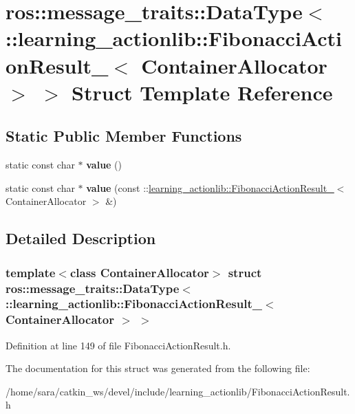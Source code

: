 \hypertarget{structros_1_1message__traits_1_1DataType_3_01_1_1learning__actionlib_1_1FibonacciActionResult___7dcb5a3074c9ee8e9d1bacdcd8ac1ad5}{}\section{ros\+:\+:message\+\_\+traits\+:\+:Data\+Type$<$ \+:\+:learning\+\_\+actionlib\+:\+:Fibonacci\+Action\+Result\+\_\+$<$ Container\+Allocator $>$ $>$ Struct Template Reference}
\label{structros_1_1message__traits_1_1DataType_3_01_1_1learning__actionlib_1_1FibonacciActionResult___7dcb5a3074c9ee8e9d1bacdcd8ac1ad5}
\subsection*{Static Public Member Functions}
\begin{DoxyCompactItemize}
\item 
\mbox{\label{structros_1_1message__traits_1_1DataType_3_01_1_1learning__actionlib_1_1FibonacciActionResult___7dcb5a3074c9ee8e9d1bacdcd8ac1ad5_a2de843da3e60ef215a1ab0a76f180df3}} 
static const char $\ast$ {\bfseries value} ()
\item 
\mbox{\label{structros_1_1message__traits_1_1DataType_3_01_1_1learning__actionlib_1_1FibonacciActionResult___7dcb5a3074c9ee8e9d1bacdcd8ac1ad5_a013607bcf1b6bbd3f455ba90a1015767}} 
static const char $\ast$ {\bfseries value} (const \+::\hyperlink{structlearning__actionlib_1_1FibonacciActionResult__}{learning\+\_\+actionlib\+::\+Fibonacci\+Action\+Result\+\_\+}$<$ Container\+Allocator $>$ \&)
\end{DoxyCompactItemize}


\subsection{Detailed Description}
\subsubsection*{template$<$class Container\+Allocator$>$\newline
struct ros\+::message\+\_\+traits\+::\+Data\+Type$<$ \+::learning\+\_\+actionlib\+::\+Fibonacci\+Action\+Result\+\_\+$<$ Container\+Allocator $>$ $>$}



Definition at line 149 of file Fibonacci\+Action\+Result.\+h.



The documentation for this struct was generated from the following file\+:\begin{DoxyCompactItemize}
\item 
/home/sara/catkin\+\_\+ws/devel/include/learning\+\_\+actionlib/Fibonacci\+Action\+Result.\+h\end{DoxyCompactItemize}
